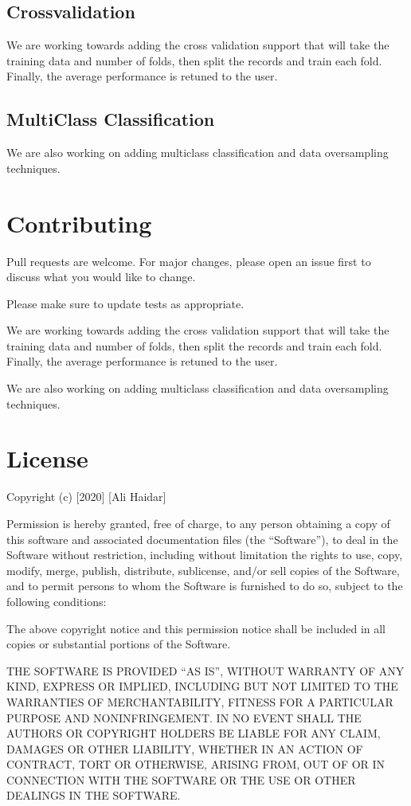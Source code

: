 \documentclass[letterpaper,10pt,english]{sphinxmanual}
\begin{document}
\section{Crossvalidation}
\label{\detokenize{index:crossvalidation}}
We are working towards adding the cross validation support that will take the training data and number of folds, then split the records and train each fold. Finally, the average performance is retuned to the user.


\section{Multi\sphinxhyphen{}Class Classification}
\label{\detokenize{index:multi-class-classification}}
We are also working on adding multi\sphinxhyphen{}class classification and data oversampling techniques.


\chapter{Contributing}
\label{\detokenize{index:contributing}}
Pull requests are welcome. For major changes, please open an issue first
to discuss what you would like to change.

Please make sure to update tests as appropriate.

We are working towards adding the cross validation support that will take the training data and number of folds, then split the records and train each fold. Finally, the average performance is retuned to the user.

We are also working on adding multi\sphinxhyphen{}class classification and data oversampling techniques.


\chapter{License}
\label{\detokenize{index:license}}
Copyright (c) {[}2020{]} {[}Ali Haidar{]}

Permission is hereby granted, free of charge, to any person obtaining a copy
of this software and associated documentation files (the “Software”), to deal
in the Software without restriction, including without limitation the rights
to use, copy, modify, merge, publish, distribute, sublicense, and/or sell
copies of the Software, and to permit persons to whom the Software is
furnished to do so, subject to the following conditions:

The above copyright notice and this permission notice shall be included in all
copies or substantial portions of the Software.

THE SOFTWARE IS PROVIDED “AS IS”, WITHOUT WARRANTY OF ANY KIND, EXPRESS OR
IMPLIED, INCLUDING BUT NOT LIMITED TO THE WARRANTIES OF MERCHANTABILITY,
FITNESS FOR A PARTICULAR PURPOSE AND NONINFRINGEMENT. IN NO EVENT SHALL THE
AUTHORS OR COPYRIGHT HOLDERS BE LIABLE FOR ANY CLAIM, DAMAGES OR OTHER
LIABILITY, WHETHER IN AN ACTION OF CONTRACT, TORT OR OTHERWISE, ARISING FROM,
OUT OF OR IN CONNECTION WITH THE SOFTWARE OR THE USE OR OTHER DEALINGS IN THE
SOFTWARE.



\renewcommand{\indexname}{Index}
\printindex
\end{document}
